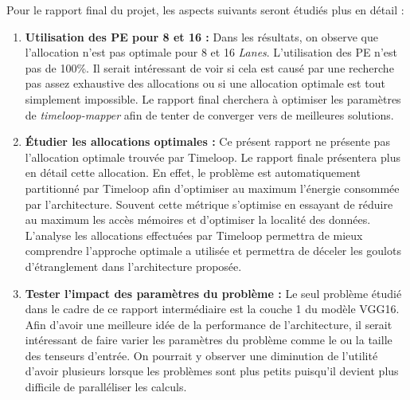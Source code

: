 \documentclass[11pt,letterpaper]{article}
\begin{document}
    \noindent Pour le rapport final du projet, les aspects suivants seront étudiés plus en détail :
    \begin{enumerate}
        \item \textbf{Utilisation des PE pour 8 et 16  :}
            Dans les résultats, on observe que l'allocation n'est pas optimale pour 8 et 16 \textit{Lanes}.
            L'utilisation des PE n'est pas de 100\%. Il serait intéressant de voir si cela est causé par une 
            recherche pas assez exhaustive des allocations ou si une allocation optimale est tout simplement 
            impossible. Le rapport final cherchera à optimiser les paramètres de \textit{timeloop-mapper} afin
            de tenter de converger vers de meilleures solutions.
        \item \textbf{Étudier les allocations optimales :}
            Ce présent rapport ne présente pas l'allocation optimale trouvée par Timeloop. Le rapport finale 
            présentera plus en détail cette allocation. En effet, le problème est automatiquement partitionné
            par Timeloop afin d'optimiser au maximum l'énergie consommée par l'architecture. Souvent cette métrique
            s'optimise en essayant de réduire au maximum les accès mémoires et d'optimiser la localité des données.
            L'analyse les allocations effectuées par Timeloop permettra de mieux comprendre l'approche optimale a utilisée
            et permettra de déceler les goulots d'étranglement dans l'architecture proposée.
        \item \textbf{Tester l'impact des paramètres du problème :} 
            Le seul problème étudié dans le cadre de ce rapport intermédiaire est la couche 1 du modèle VGG16.
            Afin d'avoir une meilleure idée de la performance de l'architecture, il serait intéressant de faire
            varier les paramètres du problème comme le  ou la taille des tenseurs d'entrée. On pourrait
            y observer une diminution de l'utilité d'avoir plusieurs  lorsque les problèmes sont plus petits
            puisqu'il devient plus difficile de paralléliser les calculs.
    \end{enumerate}
\end{document}
